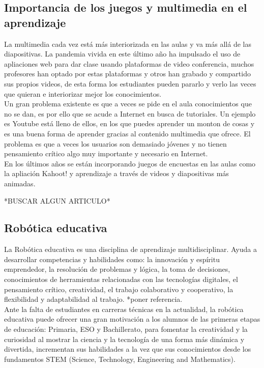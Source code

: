 \subsection{Importancia de los juegos y multimedia en el aprendizaje} 
La multimedia cada vez está más interiorizada en las aulas y va más allá de las diapositivas. La pandemia vivida en este último año ha impulsado el uso de apliaciones web para dar clase usando plataformas de video conferencia, muchos profesores han optado por estas plataformas y otros han grabado y compartido sus propios videos, de esta forma los estudiantes pueden pararlo y verlo las veces que quieran e interiorizar mejor los conocimientos.\\ Un gran problema existente es que a veces se pide en el aula conocimientos que no se dan, es por ello que se acude a Internet en busca de tutoriales. Un ejemplo es Youtube está lleno de ellos, en los que puedes aprender un monton de cosas y es una buena forma de aprender gracias al contenido multimedia que ofrece. El problema es que a veces los usuarios son demasiado jóvenes y no tienen pensamiento crítico algo muy importante y necesario en Internet.
\\
En los últimos años se están incorporando juegos de encuestas en las aulas como la apliación Kahoot! y  aprendizaje a través de videos y diapositivas más animadas.

*BUSCAR ALGUN ARTICULO*



\subsection{Robótica educativa} 
La Robótica educativa es una disciplina de aprendizaje multidisciplinar. Ayuda a desarrollar competencias y habilidades como: la innovación y espíritu emprendedor, la resolución de problemas y lógica, la toma de decisiones, conocimientos de herramientas relacionadas con las tecnologías digitales, el pensamiento crítico, creatividad, el trabajo colaborativo y cooperativo, la flexibilidad y adaptabilidad al trabajo. *poner referencia.
\\
Ante la falta de estudiantes en carreras técnicas en la actualidad, la robótica educativa puede ofrecer una gran motivación a los alumnos de las primeras etapas de educación: Primaria, ESO y Bachillerato, para fomentar la creatividad y la curiosidad al mostrar la ciencia y la tecnología de una forma más dinámica y divertida, incrementan sus habilidades a la vez que sus conocimientos desde los fundamentos STEM (Science, Technology, Engineering and Mathematics).

